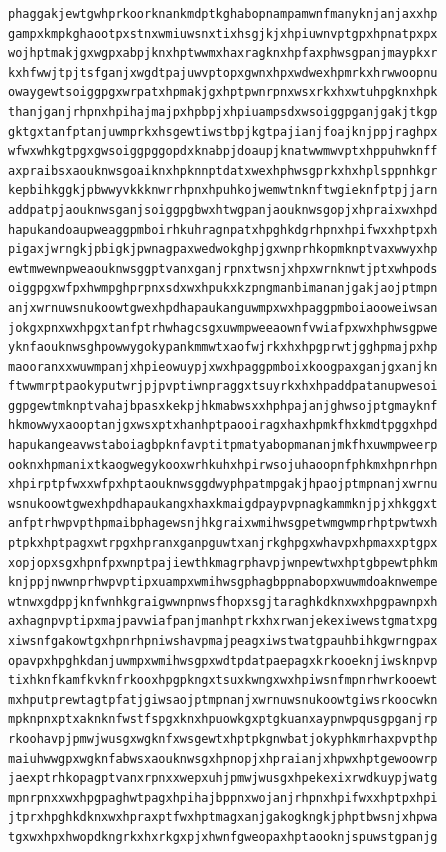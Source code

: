 \documentclass[11pt,letterpaper]{exam}
\begin{document}
\begin{questions}
\begin{verbatim}
phaggakjewtgwhprkoorknankmdptkghabopnampamwnfmanyknjanjaxxhp
gampxkmpkghaootpxstnxwmiuwsnxtixhsgjkjxhpiuwnvptgpxhpnatpxpx
wojhptmakjgxwgpxabpjknxhptwwmxhaxragknxhpfaxphwsgpanjmaypkxr
kxhfwwjtpjtsfganjxwgdtpajuwvptopxgwnxhpxwdwexhpmrkxhrwwoopnu
owaygewtsoiggpgxwrpatxhpmakjgxhptpwnrpnxwsxrkxhxwtuhpgknxhpk
thanjganjrhpnxhpihajmajpxhpbpjxhpiuampsdxwsoiggpganjgakjtkgp
gktgxtanfptanjuwmprkxhsgewtiwstbpjkgtpajianjfoajknjppjraghpx
wfwxwhkgtpgxgwsoiggpggopdxknabpjdoaupjknatwwmwvptxhppuhwknff
axpraibsxaouknwsgoaiknxhpknnptdatxwexhphwsgprkxhxhplsppnhkgr
kepbihkggkjpbwwyvkkknwrrhpnxhpuhkojwemwtnknftwgieknfptpjjarn
addpatpjaouknwsganjsoiggpgbwxhtwgpanjaouknwsgopjxhpraixwxhpd
hapukandoaupweaggpmboirhkuhragnpatxhpghkdgrhpnxhpifwxxhptpxh
pigaxjwrngkjpbigkjpwnagpaxwedwokghpjgxwnprhkopmknptvaxwwyxhp
ewtmwewnpweaouknwsggptvanxganjrpnxtwsnjxhpxwrnknwtjptxwhpods
oiggpgxwfpxhwmpghprpnxsdxwxhpukxkzpngmanbimananjgakjaojptmpn
anjxwrnuwsnukoowtgwexhpdhapaukanguwmpxwxhpaggpmboiaooweiwsan
jokgxpnxwxhpgxtanfptrhwhagcsgxuwmpweeaownfvwiafpxwxhphwsgpwe
yknfaouknwsghpowwygokypankmmwtxaofwjrkxhxhpgprwtjgghpmajpxhp
maooranxxwuwmpanjxhpieowuypjxwxhpaggpmboixkoogpaxganjgxanjkn
ftwwmrptpaokyputwrjpjpvptiwnpraggxtsuyrkxhxhpaddpatanupwesoi
ggpgewtmknptvahajbpasxkekpjhkmabwsxxhphpajanjghwsojptgmayknf
hkmowwyxaooptanjgxwsxptxhanhptpaooiragxhaxhpmkfhxkmdtpggxhpd
hapukangeavwstaboiagbpknfavptitpmatyabopmananjmkfhxuwmpweerp
ooknxhpmanixtkaogwegykooxwrhkuhxhpirwsojuhaoopnfphkmxhpnrhpn
xhpirptpfwxxwfpxhptaouknwsggdwyphpatmpgakjhpaojptmpnanjxwrnu
wsnukoowtgwexhpdhapaukangxhaxkmaigdpaypvpnagkammknjpjxhkggxt
anfptrhwpvpthpmaibphagewsnjhkgraixwmihwsgpetwmgwmprhptpwtwxh
ptpkxhptpagxwtrpgxhpranxganpguwtxanjrkghpgxwhavpxhpmaxxptgpx
xopjopxsgxhpnfpxwnptpajiewthkmagrphavpjwnpewtwxhptgbpewtphkm
knjppjnwwnprhwpvptipxuampxwmihwsgphagbppnabopxwuwmdoaknwempe
wtnwxgdppjknfwnhkgraigwwnpnwsfhopxsgjtaraghkdknxwxhpgpawnpxh
axhagnpvptipxmajpavwiafpanjmanhptrkxhxrwanjekexiwewstgmatxpg
xiwsnfgakowtgxhpnrhpniwshavpmajpeagxiwstwatgpauhbihkgwrngpax
opavpxhpghkdanjuwmpxwmihwsgpxwdtpdatpaepagxkrkooeknjiwsknpvp
tixhknfkamfkvknfrkooxhpgpkngxtsuxkwngxwxhpiwsnfmpnrhwrkooewt
mxhputprewtagtpfatjgiwsaojptmpnanjxwrnuwsnukoowtgiwsrkoocwkn
mpknpnxptxaknknfwstfspgxknxhpuowkgxptgkuanxaypnwpqusgpganjrp
rkoohavpjpmwjwusgxwgknfxwsgewtxhptpkgnwbatjokyphkmrhaxpvpthp
maiuhwwgpxwgknfabwsxaouknwsgxhpnopjxhpraianjxhpwxhptgewoowrp
jaexptrhkopagptvanxrpnxxwepxuhjpmwjwusgxhpekexixrwdkuypjwatg
mpnrpnxxwxhpgpaghwtpagxhpihajbppnxwojanjrhpnxhpifwxxhptpxhpi
jtprxhpghkdknxwxhpraxptfwxhptmagxanjgakogkngkjphptbwsnjxhpwa
tgxwxhpxhwopdkngrkxhxrkgxpjxhwnfgweopaxhptaooknjspuwstgpanjg

\end{verbatim}
\end{questions}
\end{document}
